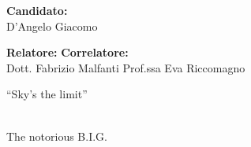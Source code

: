 \begin{titlepage}
\begin{center}
\begin{LARGE}

\textbf{Candidato:}\\
D'Angelo Giacomo

\vskip 1.5cm
\centering
\parbox{17cm}{
    \hspace{1cm} \textbf{Relatore:} \hspace{4.3cm} \textbf{Correlatore:} \\  
    Dott. Fabrizio Malfanti  \hspace{1.2cm} Prof.ssa Eva Riccomagno
 }


\end{LARGE}
\end{center}
\end{titlepage}

\newpage
\vspace{2.0cm}
\begin{flushright}
 \begin{it}
 ``Sky's the limit''
 \end{it}\\
The notorious B.I.G.
\end{flushright}


